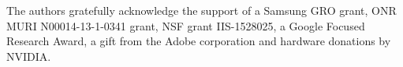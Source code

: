  The authors gratefully acknowledge the support of a Samsung GRO grant, ONR MURI N00014-13-1-0341 grant, NSF grant IIS-1528025, a Google Focused Research Award, a gift from the Adobe corporation and hardware donations by NVIDIA.